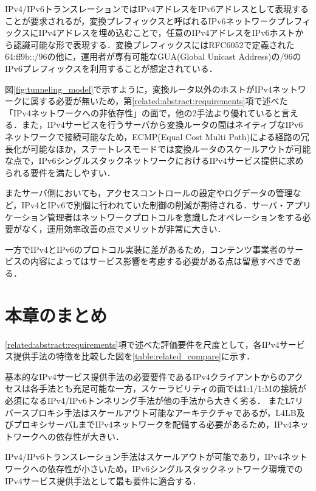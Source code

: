 IPv4/IPv6トランスレーションではIPv4アドレスをIPv6アドレスとして表現することが要求されるが，変換プレフィックスと呼ばれるIPv6ネットワークプレフィックスにIPv4アドレスを埋め込むことで，任意のIPv4アドレスをIPv6ホストから認識可能な形で表現する．変換プレフィックスにはRFC6052で定義された64:ff9b::/96の他に，運用者が専有可能なGUA(Global Unicast Address)の/96のIPv6プレフィックスを利用することが想定されている\cite{RFC6052}．

図\ref{fig:tunneling_model}で示すように，変換ルータ以外のホストがIPv4ネットワークに属する必要が無いため，第\ref{related:abstract:requirements}項で述べた「IPv4ネットワークへの非依存性」の面で，他の2手法より優れていると言える．また，IPv4サービスを行うサーバから変換ルータの間はネイティブなIPv6ネットワークで接続可能なため，ECMP(Equal Cost Multi Path)\cite{rfc2992}による経路の冗長化が可能なほか，ステートレスモードでは変換ルータのスケールアウトが可能な点で，IPv6シングルスタックネットワークにおけるIPv4サービス提供に求められる要件を満たしやすい．

またサーバ側においても，アクセスコントロールの設定やログデータの管理など，IPv4とIPv6で別個に行われていた制御の削減が期待される．サーバ・アプリケーション管理者はネットワークプロトコルを意識したオペレーションをする必要がなく，運用効率改善の点でメリットが非常に大きい．

一方でIPv4とIPv6のプロトコル実装に差があるため，コンテンツ事業者のサービスの内容によってはサービス影響を考慮する必要がある点は留意すべきである．


\section{本章のまとめ}
\ref{related:abstract:requirements}項で述べた評価要件を尺度として，各IPv4サービス提供手法の特徴を比較した図を\ref{table:related_compare}に示す．

基本的なIPv4サービス提供手法の必要要件であるIPv4クライアントからのアクセスは各手法とも充足可能な一方，スケーラビリティの面では1:1/1:Mの接続が必須になるIPv4/IPv6トンネリング手法が他の手法から大きく劣る．
またL7リバースプロキシ手法はスケールアウト可能なアーキテクチャであるが，L4LB及びプロキシサーバLまでIPv4ネットワークを配備する必要があるため，IPv4ネットワークへの依存性が大きい．

IPv4/IPv6トランスレーション手法はスケールアウトが可能であり，IPv4ネットワークへの依存性が小さいため，IPv6シングルスタックネットワーク環境でのIPv4サービス提供手法として最も要件に適合する．


